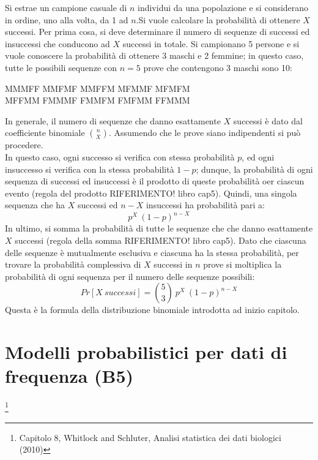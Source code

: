 \documentclass[10pt, draft]{book}
\newcounter{example}[section]
\begin{document}
\begin{example}
    Si estrae un campione casuale di $n$ individui da una popolazione e si considerano in ordine, uno alla volta, da 1 ad $n$.Si vuole calcolare la probabilità di ottenere $X$ successi. Per prima cosa, si deve determinare il numero di sequenze di successi ed insuccessi che conducono ad $X$ successi in totale.
    Si campionano 5 persone e si vuole conoscere la probabilità di ottenere 3 maschi e 2 femmine; in questo caso, tutte le possibili sequenze con $n = 5$ prove che contengono 3 maschi sono 10:

    \begin{center}
    MMMFF MMFMF MMFFM MFMMF MFMFM
    \\
    MFFMM FMMMF FMMFM FMFMM FFMMM
    \end{center}
    In generale, il numero di sequenze che danno esattamente $X$ successi è dato dal coefficiente binomiale $\binom{n}{X}$.
    Assumendo che le prove siano indipendenti si può procedere.
    \\
    In questo caso, ogni successo si verifica con stessa probabilità $p$, ed ogni insuccesso si verifica con la stessa probabilità $1-p$; dunque, la probabilità di ogni sequenza di successi ed insuccessi è il prodotto di queste probabilità oer ciascun evento (regola del prodotto RIFERIMENTO! libro cap5). Quindi, una singola sequenza che ha $X$ successi ed $n-X$ insuccessi ha probabilità pari a:
    \begin{equation}
    p^X \ (1-p)^{n-X}
    \end{equation}
    In ultimo, si somma la probabilità di tutte le sequenze che che danno esattamente $X$ successi (regola della somma RIFERIMENTO! libro cap5). Dato che ciascuna delle sequenze è mutualmente esclusiva e ciascuna ha la stessa probabilità, per trovare la probabilità complessiva di $X$ successi in $n$ prove si moltiplica la probabilità di ogni sequenza per il numero delle sequenze possibili:
    \begin{equation}
    Pr[X \ successi] = \binom{5}{3}\ p^X \ (1-p)^{n-X}
    \end{equation}
    Questa è la formula della distribuzione binomiale introdotta ad inizio capitolo.
\end{example}

\chapter{Modelli probabilistici per dati di frequenza (B5)}\footnote{Capitolo 8, Whitlock and Schluter, Analisi statistica dei dati biologici (2010)}
\end{document}
